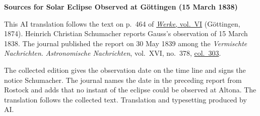 \clearpage\thispagestyle{empty}
\begin{center}\textbf{Sources for Solar Eclipse Observed at Göttingen (15 March 1838)}\end{center}
\noindent This AI translation follows the text on p.~464 of \href{https://gdz.sub.uni-goettingen.de/id/PPN236007467}{\textit{Werke}, vol.~VI} (Göttingen, 1874). Heinrich Christian Schumacher reports Gauss’s observation of 15 March 1838. The journal published the report on 30 May 1839 among the \textit{Vermischte Nachrichten}. \textit{Astronomische Nachrichten}, vol.~XVI, no.~378, \href{https://api.digitale-sammlungen.de/iiif/image/v2/bsb10049441_00162/full/1800,/0/default.jpg}{col.~303}.
\par\smallskip\noindent The collected edition gives the observation date on the time line and signs the notice Schumacher. The journal names the date in the preceding report from Rostock and adds that no instant of the eclipse could be observed at Altona. The translation follows the collected text. Translation and typesetting produced by AI.
\clearpage
